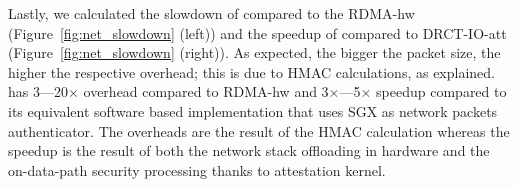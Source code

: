 



Lastly, we calculated the slowdown of \projecttitle{} compared to the RDMA-hw (Figure~\ref{fig:net_slowdown} (left)) and the speedup of \projecttitle{} compared to DRCT-IO-att  (Figure~\ref{fig:net_slowdown} (right)). As expected, the bigger the packet size, the higher the respective overhead; this is due to HMAC calculations, as explained.  \projecttitle{} has 3---20$\times$ overhead compared to RDMA-hw and 3$\times$---5$\times$ speedup compared to its equivalent software based implementation that uses SGX as network packets authenticator. The overheads are the result of the HMAC calculation whereas the speedup is the result of both the network stack offloading in hardware and the on-data-path security processing thanks to \projecttitle{} attestation kernel.
